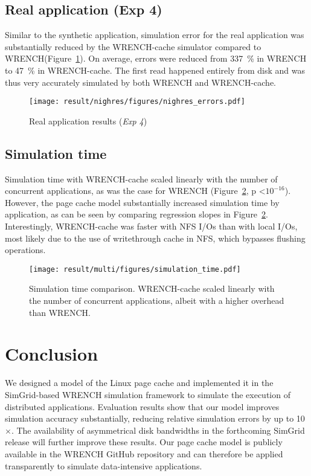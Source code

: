 \documentclass[conference]{IEEEtran}
\newcommand{\simgrid}{SimGrid\xspace}
\newcommand{\wrench}{WRENCH\xspace}
\begin{document}
        \subsection{Real application (Exp 4)}

        Similar to the synthetic application, simulation error for the real application was
        substantially reduced by the \wrench-cache simulator compared to
        \wrench (Figure~\ref{fig:nighres}). On average, errors were reduced
        from 337~\% in \wrench to 47~\% in \wrench-cache. 
        The first read happened entirely from disk and was thus 
        very accurately simulated by both \wrench and \wrench-cache.
    
        \begin{figure}[b]
                \centering
                \texttt{[image: result/nighres/figures/nighres\_errors.pdf]}
            \caption{Real application results (\textit{Exp 4})}
            \label{fig:nighres}
            \end{figure}

        \subsection{Simulation time}

        Simulation time with \wrench-cache scaled
        linearly with the number of concurrent applications, as was the case for \wrench
        (Figure~\ref{fig:multi_time}, p \textless $10^{-16}$). However, the page
        cache model substantially increased simulation time by
        application, as can be seen by comparing regression slopes in
        Figure~\ref{fig:multi_time}. Interestingly, \wrench-cache was faster with 
        NFS I/Os than with local I/Os, most likely due to the use of writethrough
        cache in NFS, which bypasses flushing operations.

        \begin{figure}
            \centering
            \texttt{[image: result/multi/figures/simulation\_time.pdf]}
            \caption{Simulation time comparison. \wrench-cache scaled
            linearly with the number of concurrent applications, albeit
            with a higher overhead than \wrench.}
            \label{fig:multi_time}
            \end{figure}

    \section{Conclusion}
    \label{discussion}
    We designed a model of the Linux page cache and implemented it in the
    \simgrid-based \wrench simulation framework to simulate the execution
    of distributed applications.
    Evaluation results show that our model improves simulation accuracy
    substantially, reducing relative simulation errors by up to
    10$\times$. The
    availability of asymmetrical disk bandwidths in the forthcoming
    \simgrid release will further improve these results.
    Our page cache model is publicly available in the \wrench GitHub
    repository and can therefore be applied transparently to simulate data-intensive applications.
\end{document}
